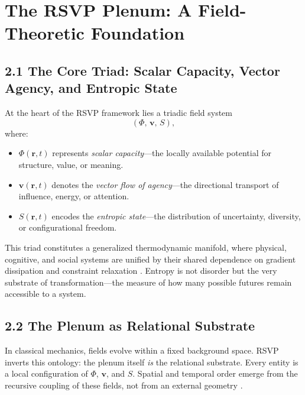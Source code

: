 \documentclass[11pt,a4paper,titlepage]{article}
\theoremstyle{definition}
\begin{document}
\section{The RSVP Plenum: A Field-Theoretic Foundation}
\label{sec:plenum}

\subsection{2.1 The Core Triad: Scalar Capacity, Vector Agency, and Entropic State}

At the heart of the RSVP framework lies a triadic field system
\[
(\Phi,\,\mathbf{v},\,S),
\]
where:
\begin{itemize}[nosep]
  \item $\Phi(\mathbf{r},t)$ represents \emph{scalar capacity}—the locally available potential for structure, value, or meaning.
  \item $\mathbf{v}(\mathbf{r},t)$ denotes the \emph{vector flow of agency}—the directional transport of influence, energy, or attention.
  \item $S(\mathbf{r},t)$ encodes the \emph{entropic state}—the distribution of uncertainty, diversity, or configurational freedom.
\end{itemize}

This triad constitutes a generalized thermodynamic manifold, where physical,
cognitive, and social systems are unified by their shared dependence on gradient
dissipation and constraint relaxation \cite{landauer1961,jaynes1957,onsager1931}.
Entropy is not disorder but the very substrate of transformation—the measure of
how many possible futures remain accessible to a system.

\subsection{2.2 The Plenum as Relational Substrate}

In classical mechanics, fields evolve within a fixed background space.
RSVP inverts this ontology: the plenum itself \emph{is} the relational substrate.
Every entity is a local configuration of $\Phi$, $\mathbf{v}$, and $S$.
Spatial and temporal order emerge from the recursive coupling of these fields,
not from an external geometry \cite{rovelli2021,whitehead1929}.
\end{document}
